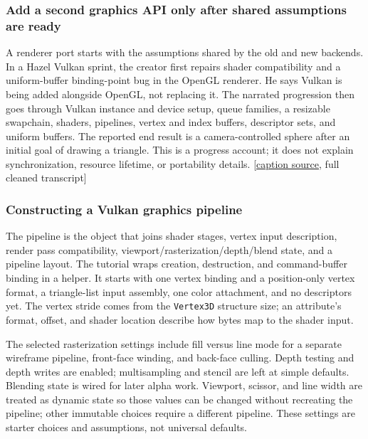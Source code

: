 \subsubsection{Add a second graphics API only after shared assumptions are ready}\label{06-engine-ii-ch025-add-a-second-graphics-api-only-after-shared-assumptions-are-ready}

A renderer port starts with the assumptions shared by the old and new backends. In a Hazel Vulkan sprint, the creator first repairs shader compatibility and a uniform-buffer binding-point bug in the OpenGL renderer. He says Vulkan is being added alongside OpenGL, not replacing it. The narrated progression then goes through Vulkan instance and device setup, queue families, a resizable swapchain, shaders, pipelines, vertex and index buffers, descriptor sets, and uniform buffers. The reported end result is a camera-controlled sphere after an initial goal of drawing a triangle. This is a progress account; it does not explain synchronization, resource lifetime, or portability details. {[}\href{https://www.youtube.com/watch?v=zUdaT19aSxA}{caption source}, full cleaned transcript{]}

\subsubsection{Constructing a Vulkan graphics pipeline}\label{06-engine-ii-ch025-constructing-a-vulkan-graphics-pipeline}

The pipeline is the object that joins shader stages, vertex input description, render pass compatibility, viewport/rasterization/depth/blend state, and a pipeline layout. The tutorial wraps creation, destruction, and command-buffer binding in a helper. It starts with one vertex binding and a position-only vertex format, a triangle-list input assembly, one color attachment, and no descriptors yet. The vertex stride comes from the \texttt{Vertex3D} structure size; an attribute's format, offset, and shader location describe how bytes map to the shader input.

The selected rasterization settings include fill versus line mode for a separate wireframe pipeline, front-face winding, and back-face culling. Depth testing and depth writes are enabled; multisampling and stencil are left at simple defaults. Blending state is wired for later alpha work. Viewport, scissor, and line width are treated as dynamic state so those values can be changed without recreating the pipeline; other immutable choices require a different pipeline. These settings are starter choices and assumptions, not universal defaults.


